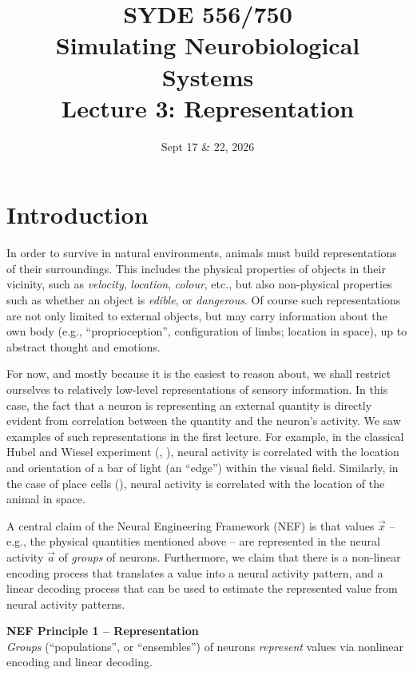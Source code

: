 \documentclass[10pt,letterpaper,oneside]{article}
\date{Sept 17 \& 22, 2026}
\title{SYDE 556/750 \\ Simulating Neurobiological Systems \\ Lecture 3: Representation}
\begin{document}

\section{Introduction}


In order to survive in natural environments, animals must build representations of their surroundings. This includes the physical properties of objects in their vicinity, such as \emph{velocity}, \emph{location}, \emph{colour}, etc., but also non-physical properties such as whether an object is \emph{edible}, or \emph{dangerous}. Of course such representations are not only limited to external objects, but may carry information about the own body (e.g., \enquote{proprioception}, configuration of limbs; location in space), up to abstract thought and emotions.

For now, and mostly because it is the easiest to reason about, we shall restrict ourselves to relatively low-level representations of sensory information. In this case, the fact that a neuron is representing an external quantity is directly evident from correlation between the quantity and the neuron's activity.  We saw examples of such representations in the first lecture. For example, in the classical Hubel and Wiesel experiment (, \cite{hubel1959receptive}), neural activity is correlated with the location and orientation of a bar of light (an \enquote{edge}) within the visual field. Similarly, in the case of place cells (), neural activity is correlated with the location of the animal in space.

A central claim of the Neural Engineering Framework (NEF) is that values $\vec x$ -- e.g., the physical quantities mentioned above -- are represented in the neural activity $\vec a$ of \emph{groups} of neurons. Furthermore, we claim that there is a non-linear encoding process that translates a value into a neural activity pattern, and a linear decoding process that can be used to estimate the represented value from neural activity patterns.

\begin{mdframed}
\textbf{NEF Principle 1 -- Representation}\\
\emph{Groups} (\enquote{populations}, or \enquote{ensembles}) of neurons \emph{represent} values via nonlinear encoding and linear decoding.
\end{mdframed}
\end{document}
